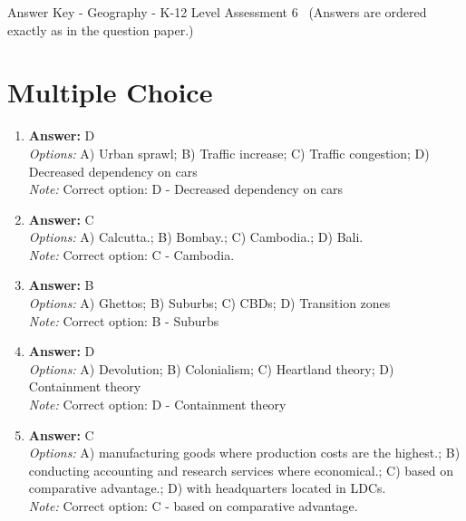 \documentclass[12pt]{article}
\begin{document}
\begin{center}
Answer Key - Geography - K-12 Level Assessment 6 \
\small (Answers are ordered exactly as in the question paper.)
\end{center}

\section*{Multiple Choice}
\begin{enumerate}[label=\arabic*.]
\item \textbf{Answer:} D
\\ \textit{Options:} A) Urban sprawl; B) Traffic increase; C) Traffic congestion; D) Decreased dependency on cars
\\ \textit{Note:} Correct option: D - Decreased dependency on cars
\item \textbf{Answer:} C
\\ \textit{Options:} A) Calcutta.; B) Bombay.; C) Cambodia.; D) Bali.
\\ \textit{Note:} Correct option: C - Cambodia.
\item \textbf{Answer:} B
\\ \textit{Options:} A) Ghettos; B) Suburbs; C) CBDs; D) Transition zones
\\ \textit{Note:} Correct option: B - Suburbs
\item \textbf{Answer:} D
\\ \textit{Options:} A) Devolution; B) Colonialism; C) Heartland theory; D) Containment theory
\\ \textit{Note:} Correct option: D - Containment theory
\item \textbf{Answer:} C
\\ \textit{Options:} A) manufacturing goods where production costs are the highest.; B) conducting accounting and research services where economical.; C) based on comparative advantage.; D) with headquarters located in LDCs.
\\ \textit{Note:} Correct option: C - based on comparative advantage.
\end{enumerate}
\end{document}
